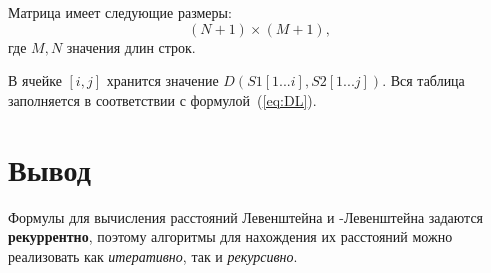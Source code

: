 Матрица имеет следующие размеры:
\begin{equation}
	\label{eq:lev-m-size}
	(N + 1) \times (M + 1),
\end{equation}
где $M, N$ значения длин строк.

В ячейке $[i, j]$ хранится значение $D(S1[1...i], S2[1...j])$. Вся таблица заполняется в соответствии с формулой~(\ref{eq:DL}). 

\section*{Вывод}
Формулы для вычисления расстояний Левенштейна и -Левенштейна задаются \textbf{рекуррентно}, поэтому алгоритмы для нахождения их расстояний можно реализовать как \textit{итеративно}, так и \textit{рекурсивно}.
